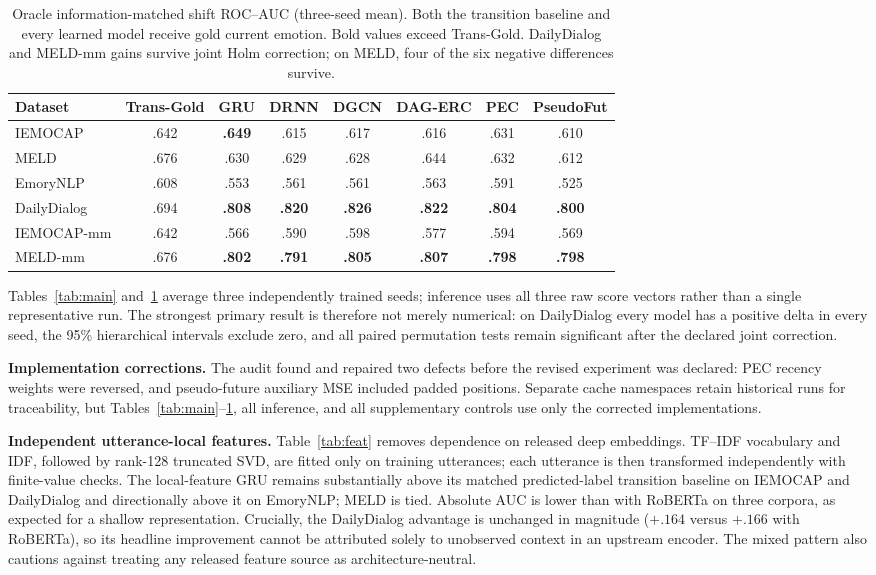 \documentclass{ieeeaccess}
\begin{document}
\begin{table}[t]
\centering
\footnotesize
\caption{Oracle information-matched shift ROC--AUC (three-seed mean). Both the transition baseline
and every learned model receive gold current emotion. Bold values exceed Trans-Gold. DailyDialog
and MELD-mm gains survive joint Holm correction; on MELD, four of the six negative differences
survive.}
\label{tab:oracle}
\begin{tabular}{lccccccc}\toprule
Dataset & Trans-Gold & GRU & DRNN & DGCN & DAG-ERC & PEC & PseudoFut \\
\midrule
IEMOCAP      & .642 & \textbf{.649} & .615 & .617 & .616 & .631 & .610 \\
MELD         & .676 & .630 & .629 & .628 & .644 & .632 & .612 \\
EmoryNLP     & .608 & .553 & .561 & .561 & .563 & .591 & .525 \\
DailyDialog  & .694 & \textbf{.808} & \textbf{.820} & \textbf{.826} & \textbf{.822} & \textbf{.804} & \textbf{.800} \\
IEMOCAP-mm   & .642 & .566 & .590 & .598 & .577 & .594 & .569 \\
MELD-mm      & .676 & \textbf{.802} & \textbf{.791} & \textbf{.805} & \textbf{.807} & \textbf{.798} & \textbf{.798} \\
\bottomrule
\end{tabular}
\end{table}

Tables~\ref{tab:main} and~\ref{tab:oracle} average three independently trained seeds; inference
uses all three raw score vectors rather than a single representative run. The strongest primary
result is therefore not merely numerical: on DailyDialog every model has a positive delta in every
seed, the 95\% hierarchical intervals exclude zero, and all paired permutation tests remain
significant after the declared joint correction.

\textbf{Implementation corrections.} The audit found and repaired two defects before the revised
experiment was declared: PEC recency weights were reversed, and pseudo-future auxiliary MSE
included padded positions. Separate cache namespaces retain historical runs for traceability, but
Tables~\ref{tab:main}--\ref{tab:oracle}, all inference, and all supplementary controls use only the
corrected implementations.

\textbf{Independent utterance-local features.} Table~\ref{tab:feat} removes dependence on released
deep embeddings. TF--IDF vocabulary and IDF, followed by rank-128 truncated SVD, are fitted only on
training utterances; each utterance is then transformed independently with finite-value checks.
The local-feature GRU remains substantially above its matched predicted-label transition baseline
on IEMOCAP and DailyDialog and directionally above it on EmoryNLP; MELD is tied. Absolute AUC is
lower than with RoBERTa on three corpora, as expected for a shallow representation. Crucially, the
DailyDialog advantage is unchanged in magnitude ($+.164$ versus $+.166$ with RoBERTa), so its
headline improvement cannot be attributed solely to unobserved context in an upstream encoder.
The mixed pattern also cautions against treating any released feature source as architecture-neutral.
\end{document}
